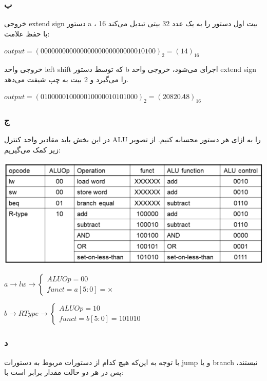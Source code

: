 \subsubsection*{ب}
خروجی extend sign دستور a ، 16 بیت اول دستور را به یک عدد 32 بیتی تبدیل می‌کند با حفظ علامت:
\setLTR

$output=(00000000000000000000000000010100)_2 = (14)_{16}$

\setRTL

خروجی واحد left shift که توسط دستور b اجرای می‌شود، خروجی واحد extend sign را می‌گیرد و 2 بیت به چپ شیفت می‌دهد.
\setLTR

$output = (010000010000010000010101000)_2 = (20820A8)_{16}$

\setRTL

\subsubsection*{ج}

در این بخش باید مقادیر واحد کنترل ALU را به ازای هر دستور محسابه کنیم. از تصویر زیر کمک می‌گیریم:

\setLTR
\qquad\qquad\qquad\qquad\qquad\includegraphics[scale=0.45]{figs/2.png}

$
a\rightarrow lw \rightarrow \begin{cases}
	ALUOp = 00 \\
	funct =  a[5:0] = \times
\end{cases}
$

$
b\rightarrow R Type \rightarrow \begin{cases}
	ALUOp = 10 \\
	funct = b[5:0] = 101010
\end{cases}
$

\setRTL

\subsubsection*{د}

با توجه به این‌که هیچ کدام از دستورات مربوط به دستورات jump و یا branch نیستند، پس در هر دو حالت مقدار برابر است با:

